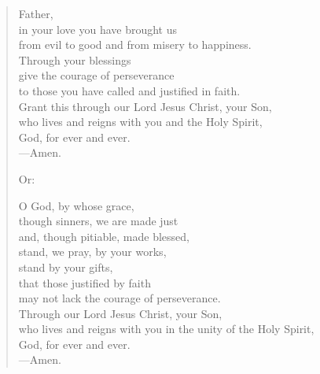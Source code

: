 \prayer

\setlength{\vleftmargin}{\prayerleftmargini}

\begin{verse}
Father,\\
in your love you have brought us\\
from evil to good and from misery to happiness.\\
Through your blessings\\
give the courage of perseverance\\
to those you have called and justified in faith.\\
Grant this through our Lord Jesus Christ, your Son,\\
who lives and reigns with you and the Holy Spirit,\\
God, for ever and ever.\\
{\color{red}---\thinspace}Amen.

{\color{red}Or:}

O God, by whose grace,\\
though sinners, we are made just\\
and, though pitiable, made blessed,\\
stand, we pray, by your works,\\
stand by your gifts,\\
that those justified by faith\\
may not lack the courage of perseverance.\\
Through our Lord Jesus Christ, your Son,\\
who lives and reigns with you in the unity of the Holy Spirit,\\
God, for ever and ever.\\
{\color{red}---\thinspace}Amen.
\end{verse}

\setlength{\vleftmargin}{\defleftmargini}
